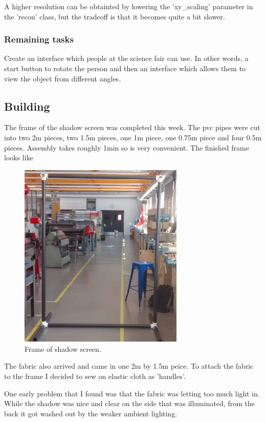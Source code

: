 \documentclass[a4paper]{article}
\begin{document}
A higher resolution can be obtainted by lowering the 'xy\_scaling' parameter in the 'recon' class, but the tradeoff is that it becomes quite a bit slower.

\subsubsection{Remaining tasks}
Create an interface which people at the science fair can use.
In other words, a start button to rotate the person and then an interface which allows them to view the object from different angles.

\subsection{Building}
The frame of the shadow screen was completed this week.
The pvc pipes were cut into two 2m pieces, two 1.5m pieces, one 1m piece, one 0.75m piece and four 0.5m pieces.
Assembly takes roughly 1min so is very convenient. The finished frame looks like

\begin{figure}[H]
  \centering
    \includegraphics[width=0.7\textwidth]{figures/skeleton.jpg}
    \caption{Frame of shadow screen.}
  \label{fig:f2}
\end{figure}

The fabric also arrived and came in one 2m by 1.5m peice.
To attach the fabric to the frame I decided to sew on elastic cloth as 'handles'. 

One early problem that I found was that the fabric was letting too much light in.
While the shadow was nice and clear on the side that was illuminated, from the back it got washed out by the weaker ambient lighting.
\end{document}
